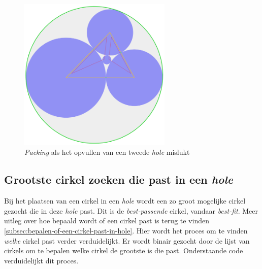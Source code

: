 \documentclass[12pt,a4paper,oneside]{book}
\begin{document}
\begin{figure}
  \centering
  \includegraphics[width=0.65\textwidth]{voorbeeld-gat-stap-3alt.png}
  \caption{\textit{Packing} als het opvullen van een tweede \textit{hole} mislukt} \label{fig:voorbeeld-gat-stap-3alt} 
\end{figure}

\subsection{Grootste cirkel zoeken die past in een \textit{hole}} \label{sec:grootste-cirkel-zoeken-die-past-in-een-hole}

Bij het plaatsen van een cirkel in een \textit{hole} wordt een zo groot mogelijke cirkel gezocht die in deze \textit{hole} past.
Dit is de \textit{best-passende} cirkel, vandaar \textit{best-fit}.
Meer uitleg over hoe bepaald wordt of een cirkel past is terug te vinden \autoref{subsec:bepalen-of-een-cirkel-past-in-hole}.
Hier wordt het proces om te vinden \textit{welke} cirkel past verder verduidelijkt.
Er wordt binair gezocht door de lijst van cirkels om te bepalen welke cirkel de grootste is die past.
Onderstaande code verduidelijkt dit proces.
\end{document}
